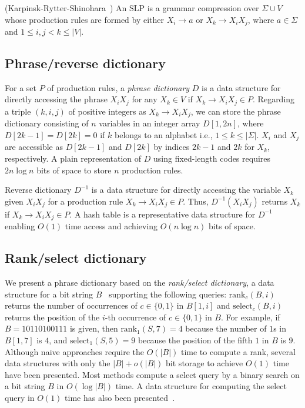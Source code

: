 \documentclass[10pt]{llncs}
\begin{document}
\begin{definition}\label{SLP}(Karpinsk-Rytter-Shinohara~\cite{SLP})
An SLP is a grammar compression over $\Sigma\cup V$ 
whose production rules are formed by either 
$X_i\to a$ or $X_k\to X_iX_j$, where $a\in\Sigma$ and $1\leq i,j < k\leq |V|$.
\end{definition}


\subsection{Phrase/reverse dictionary}
For a set $P$ of production rules,
a {\em phrase dictionary} $D$ is a data structure for directly accessing
 the phrase $X_iX_j$ for any $X_k\in V$ if $X_k\to X_iX_j \in P$.
Regarding a triple $(k,i,j)$ of positive integers as $X_k\to X_iX_j$, 
we can store the phrase dictionary consisting of $n$ variables in an integer array $D[1,2n]$, 
where $D[2k-1]=D[2k]=0$ if $k$ belongs to an alphabet i.e., $1 \leq k \leq |\Sigma|$. 
$X_i$ and $X_j$ are accessible as $D[2k-1]$ and $D[2k]$ by indices $2k-1$ and $2k$ for $X_k$, 
respectively. 
A plain representation of $D$ using fixed-length codes requires $2n\log n$ bits of space to store 
$n$ production rules.

Reverse dictionary $D^{-1}$ is a data structure for directly accessing the variable $X_k$ 
given $X_iX_j$ for a production rule $X_k\to X_iX_j \in P$. 
Thus, $D^{-1}(X_iX_j)$ returns $X_k$ if $X_k \rightarrow X_iX_j \in P$.
A hash table is a representative data structure for $D^{-1}$ enabling $O(1)$ time access 
and achieving $O(n\log n)$ bits of space. 

\subsection{Rank/select dictionary}
We present a phrase dictionary based on the {\em rank/select dictionary}, 
a data structure for a bit string $B$~\cite{Jacobson89} supporting the following queries:
$\mbox{rank}_c(B,i)$ returns the number of occurrences of $c \in \{0,1\}$ in $B[1,i]$ and 
$\mbox{select}_c(B,i)$ returns the position of the $i$-th occurrence of $c \in \{0, 1\}$ in $B$.
For example, if $B=10110100111$ is given, then $\mbox{rank}_1(S,7)=4$ because the number of $1$s in 
$B[1,7]$ is $4$,
and $\mbox{select}_1(S,5)=9$ because the position of the fifth $1$ in $B$ is $9$.
Although naive approaches require the $O(|B|)$ time to compute a rank, 
several data structures with only the $|B|+o(|B|)$ bit storage to 
achieve $O(1)$ time~\cite{Navarro12,Okanohara07} have been presented. 
Most methods compute a select query by a binary search on a bit string $B$ in $O(\log |B|)$ time. 
A data structure for computing the select query in $O(1)$ time has also been presented~\cite{Ram02}.
\end{document}

